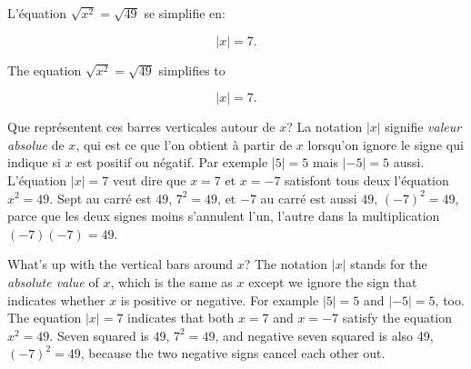 \begin{paracol}{2}

	\begin{leftcolumn*}

		\begin{otherlanguage}{french}
	L'équation $\sqrt{x^2}= \sqrt{49}$ se simplifie en: 

	\[
	 	|x|	= 	7.
	\]
		\end{otherlanguage}

	\end{leftcolumn*}



	\begin{rightcolumn}

	The equation $\sqrt{x^2}= \sqrt{49}$ simplifies to 

	\[
	 	|x|	= 	7.
	\]

	\end{rightcolumn}

\end{paracol}


\begin{paracol}{2}

	\begin{leftcolumn*}

		\begin{otherlanguage}{french}
	Que représentent ces barres verticales autour de $x$?
	La notation $|x|$ signifie \emph{valeur absolue} de $x$,											
	qui est ce que l'on obtient à partir de $x$ lorsqu'on ignore le signe qui indique si $x$ est positif ou négatif. 
	Par exemple $|5|=5$ mais $|-5|=5$ aussi.
	L'équation $|x|=7$ veut dire que $x=7$ et $x=-7$ satisfont tous deux l'équation $x^2 = 49$.
	Sept au carré est $49$, $7^2=49$, et $-7$ au carré est aussi $49$, 
	$(-7)^2 = 49$,
	parce que les deux signes moins s'annulent l'un, l'autre dans la multiplication $(-7)(-7)=49$.


		\end{otherlanguage}

	\end{leftcolumn*}



	\begin{rightcolumn}

	What's up with the vertical bars around $x$?
	The notation $|x|$ stands for the \emph{absolute value} of $x$,											
	which is the same as $x$ except we ignore the sign that indicates whether $x$ is positive or negative. 
	For example $|5|=5$ and $|-5|=5$, too.
	The equation $|x|=7$ indicates that both $x=7$ and $x=-7$ satisfy the equation $x^2 = 49$.
	Seven squared is 49, $7^2=49$, and negative seven squared is also 49, $(-7)^2 = 49$,
	because the two negative signs cancel each other out.



	\end{rightcolumn}

\end{paracol}

